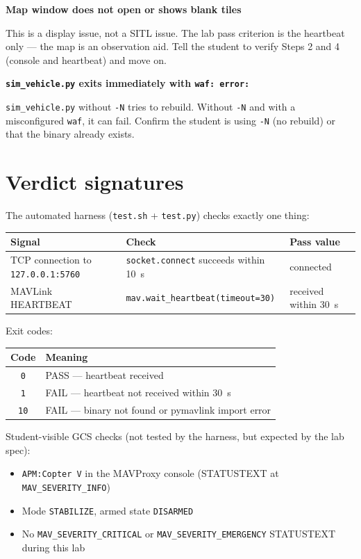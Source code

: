 \documentclass[a4paper,11pt,twoside]{article}
\begin{document}
\textbf{Map window does not open or shows blank tiles}

This is a display issue, not a SITL issue. The lab pass criterion is the heartbeat only --- the map is an observation aid. Tell the student to verify Steps 2 and 4 (console and heartbeat) and move on.

\textbf{\texttt{sim\_vehicle.py} exits immediately with \texttt{waf: error:}}

\texttt{sim\_vehicle.py} without \texttt{-N} tries to rebuild. Without \texttt{-N} and with a misconfigured \texttt{waf}, it can fail. Confirm the student is using \texttt{-N} (no rebuild) or that the binary already exists.

\section*{Verdict signatures}

The automated harness (\texttt{test.sh} + \texttt{test.py}) checks exactly one thing:

\begin{center}\small
\begin{tabular}{|p{4.5cm}|p{6.5cm}|p{3.5cm}|}\hline
\textbf{Signal} & \textbf{Check} & \textbf{Pass value} \\ \hline
TCP connection to \texttt{127.0.0.1:5760} & \texttt{socket.connect} succeeds within 10~s & connected \\ \hline
MAVLink HEARTBEAT & \texttt{mav.wait\_heartbeat(timeout=30)} & received within 30~s \\ \hline
\end{tabular}
\end{center}

Exit codes:

\begin{center}\small
\begin{tabular}{|c|p{12cm}|}\hline
\textbf{Code} & \textbf{Meaning} \\ \hline
\texttt{0} & PASS --- heartbeat received \\ \hline
\texttt{1} & FAIL --- heartbeat not received within 30~s \\ \hline
\texttt{10} & FAIL --- binary not found or pymavlink import error \\ \hline
\end{tabular}
\end{center}

Student-visible GCS checks (not tested by the harness, but expected by the lab spec):
\begin{itemize}
  \item \texttt{APM:Copter V} in the MAVProxy console (STATUSTEXT at \texttt{MAV\_SEVERITY\_INFO})
  \item Mode \texttt{STABILIZE}, armed state \texttt{DISARMED}
  \item No \texttt{MAV\_SEVERITY\_CRITICAL} or \texttt{MAV\_SEVERITY\_EMERGENCY} STATUSTEXT during this lab
\end{itemize}
\end{document}
